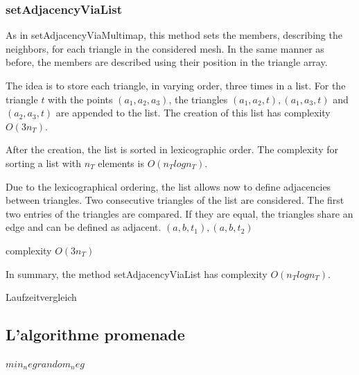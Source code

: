 \documentclass[10pt]{article}
\begin{document}
\subsubsection{setAdjacencyViaList} \label{list}
As in setAdjacencyViaMultimap, this method sets the members, describing the neighbors, for each triangle in the considered mesh. In the same manner as before, the members are described using their position in the triangle array.

The idea is to store each triangle, in varying order, three times in a list. For the triangle $t$ with the points $(a_1,a_2,a_3)$, the triangles $(a_1,a_2,t), (a_1,a_3,t)$ and $(a_2,a_3,t)$ are appended to the list. The creation of this list has complexity $O(3n_T)$.

After the creation, the list is sorted in lexicographic order. The complexity for sorting a list with $n_T$ elements is $O(n_Tlogn_T)$.

Due to the lexicographical ordering, the list allows now to define adjacencies between triangles. Two consecutive triangles of the list are considered. The first two entries of the triangles are compared. If they are equal, the triangles share an edge and can be defined as adjacent. $(a,b,t_1), (a,b,t_2)$

complexity $O(3n_T)$

In summary, the method setAdjacencyViaList has complexity $O(n_Tlogn_T)$.

Laufzeitvergleich

\subsection{L'algorithme promenade} \label{promenade}
$
min_neg random_neg
$
\end{document}
